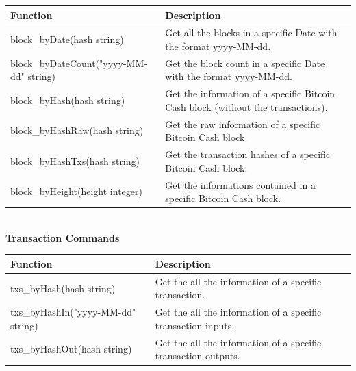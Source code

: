\begin{table}[!ht]
    \centering
    \begin{tabular}{||l|p{6cm}||}
    \hline
    \textbf{Function}                          & \textbf{Description}                                                  \\ \hline
    block\_byDate(hash string)                 & Get all the blocks in a specific Date with the format yyyy-MM-dd.                          \\ \hline
    block\_byDateCount("yyyy-MM-dd" string)    & Get the block count in a specific Date with the format yyyy-MM-dd.             \\ \hline
    block\_byHash(hash string)                 & Get the information of a specific Bitcoin Cash block (without the transactions).         \\ \hline
    block\_byHashRaw(hash string)              & Get the raw information of a specific Bitcoin Cash block.             \\ \hline
    block\_byHashTxs(hash string)              & Get the transaction hashes of a specific Bitcoin Cash block.             \\ \hline
    block\_byHeight(height integer)            & Get the informations contained in a specific Bitcoin Cash block.                     \\ \hline
    \end{tabular}
    \end{table}\pagebreak
\medskip\\
\textbf{Transaction Commands}
\begin{table}[!ht]
    \centering
    \begin{tabular}{||l|p{6cm}||}
    \hline
    \textbf{Function}                          & \textbf{Description}                                                  \\ \hline
    txs\_byHash(hash string)                   & Get the all the information of a specific transaction\footnotemark[2].                          \\ \hline
    txs\_byHashIn("yyyy-MM-dd" string)         & Get the all the information of a specific transaction inputs\footnotemark[2].      \\ \hline
    txs\_byHashOut(hash string)                & Get the all the information of a specific transaction outputs\footnotemark[2].          \\ \hline
    \end{tabular}
    \end{table}
